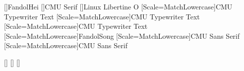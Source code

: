\usepackage[russian,croatian,chinese,shorthands=off,provide*=*]{babel}
[]{FandolHei}
[]{CMU Serif}
[]{Linux Libertine O}
[Scale=MatchLowercase]{CMU Typewriter Text}
[Scale=MatchLowercase]{CMU Typewriter Text}
[Scale=MatchLowercase]{CMU Typewriter Text}
[Scale=MatchLowercase]{FandolSong}
[Scale=MatchLowercase]{CMU Sans Serif}
[Scale=MatchLowercase]{CMU Sans Serif}
\usepackage{xeCJK}
[]
[]
[]
